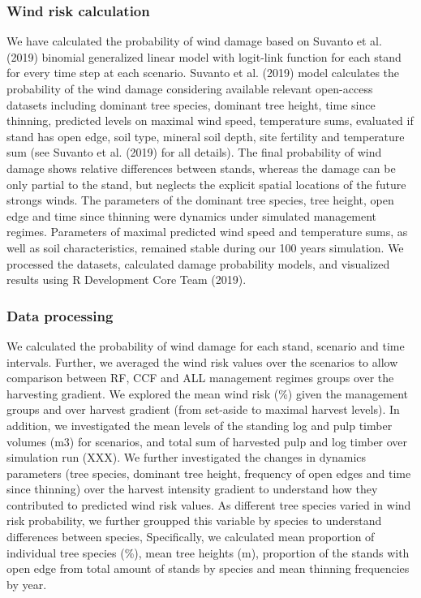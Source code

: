 \documentclass[]{elsarticle} %
\begin{document}
\subsubsection{Wind risk calculation}\label{wind-risk-calculation}

We have calculated the probability of wind damage based on Suvanto et
al. (2019) binomial generalized linear model with logit-link function
for each stand for every time step at each scenario. Suvanto et al.
(2019) model calculates the probability of the wind damage considering
available relevant open-access datasets including dominant tree species,
dominant tree height, time since thinning, predicted levels on maximal
wind speed, temperature sums, evaluated if stand has open edge, soil
type, mineral soil depth, site fertility and temperature sum (see
Suvanto et al. (2019) for all details). The final probability of wind
damage shows relative differences between stands, whereas the damage can
be only partial to the stand, but neglects the explicit spatial
locations of the future strongs winds. The parameters of the dominant
tree species, tree height, open edge and time since thinning were
dynamics under simulated management regimes. Parameters of maximal
predicted wind speed and temperature sums, as well as soil
characteristics, remained stable during our 100 years simulation. We
processed the datasets, calculated damage probability models, and
visualized results using R Development Core Team (2019).

\subsubsection{Data processing}\label{data-processing}

We calculated the probability of wind damage for each stand, scenario
and time intervals. Further, we averaged the wind risk values over the
scenarios to allow comparison between RF, CCF and ALL management regimes
groups over the harvesting gradient. We explored the mean wind risk (\%)
given the management groups and over harvest gradient (from set-aside to
maximal harvest levels). In addition, we investigated the mean levels of
the standing log and pulp timber volumes (m3) for scenarios, and total
sum of harvested pulp and log timber over simulation run (XXX). We
further investigated the changes in dynamics parameters (tree species,
dominant tree height, frequency of open edges and time since thinning)
over the harvest intensity gradient to understand how they contributed
to predicted wind risk values. As different tree species varied in wind
risk probability, we further groupped this variable by species to
understand differences between species, Specifically, we calculated mean
proportion of individual tree species (\%), mean tree heights (m),
proportion of the stands with open edge from total amount of stands by
species and mean thinning frequencies by year.
\end{document}
